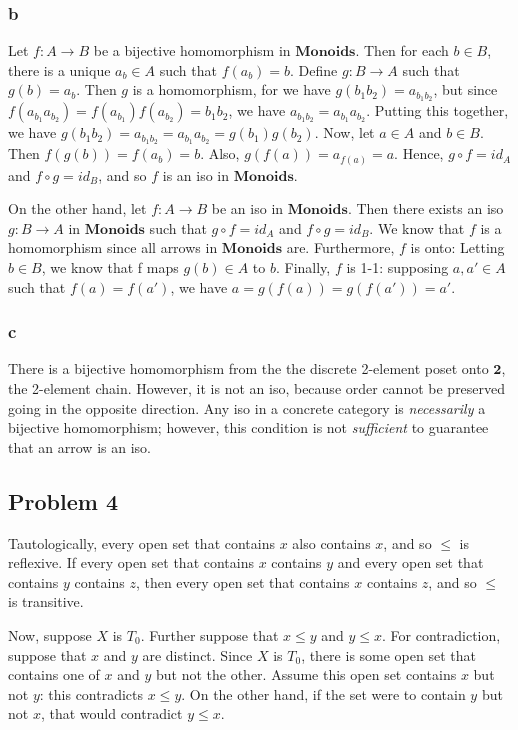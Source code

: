 \documentclass{article}
\newcommand{\mbf}{\mathbf}
\begin{document}
\subsubsection{b}

Let $f : A \to B$ be a bijective homomorphism in $\mbf{Monoids}$. Then for each $b \in B$,
there is a unique $a_b \in A$ such that $f(a_b) = b$. Define $g : B \to A$ such that $g(b) = a_b$.
Then $g$ is a homomorphism, for we have $g(b_1 b_2) = a_{b_1 b_2}$, but since 
$f(a_{b_1} a_{b_2}) = f(a_{b_1}) f(a_{b_2}) = b_1 b_2$, we have $a_{b_1 b_2} = a_{b_1} a_{b_2}$.
Putting this together, we have $g(b_1 b_2) = a_{b_1 b_2} = a_{b_1} a_{b_2} = g(b_1) g(b_2)$.
Now, let $a \in A$ and $b \in B$. Then $f(g(b)) = f(a_b) = b$. Also, $g(f(a)) = a_{f(a)} = a$.
Hence, $g \circ f = id_A$ and $f \circ g = id_B$, and so $f$ is an iso in $\mbf{Monoids}$.

On the other hand, let $f : A \to B$ be an iso in $\mbf{Monoids}$. Then there exists
an iso $g : B \to A$ in $\mbf{Monoids}$ such that $g \circ f = id_A$ and $f \circ g = id_B$.
We know that $f$ is a homomorphism since all arrows in $\mbf{Monoids}$ are.
Furthermore, $f$ is onto: Letting $b \in B$, we know that f maps $g(b) \in A$ to $b$.
Finally, $f$ is 1-1: supposing $a,a' \in A$ such that $f(a) = f(a')$, we have
$a = g(f(a)) = g(f(a')) = a'$.

\subsubsection{c}

There is a bijective homomorphism from the the discrete 2-element poset
onto $\mbf{2}$, the 2-element chain. However, it is not an iso, because order
cannot be preserved going in the opposite direction. Any iso in a concrete
category is \emph{necessarily} a bijective homomorphism; however, this condition
is not \emph{sufficient} to guarantee that an arrow is an iso.

\subsection{Problem 4}

Tautologically, every open set that contains
$x$ also contains $x$, and so $\leq$ is reflexive. If every open set that
contains $x$ contains $y$ and every open set that contains $y$ contains $z$,
then every open set that contains $x$ contains $z$, and so $\leq$ is transitive.

Now, suppose $X$ is $T_0$. Further suppose that $x \leq y$ and $y \leq x$.
For contradiction, suppose that $x$ and $y$ are distinct. 
Since $X$ is $T_0$, there is some open set that contains one of $x$ and $y$ but not the other.
Assume this open set contains $x$ but not $y$: this contradicts $x \leq y$.
On the other hand, if the set were to contain $y$ but not $x$, that would contradict $y \leq x$.
\end{document}
